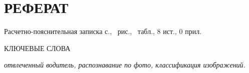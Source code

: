 \section*{РЕФЕРАТ}

Расчетно-пояснительная записка \pageref{LastPage} с., \totalfigures\ рис., \totaltables\ табл., 8 ист., 0 прил.

КЛЮЧЕВЫЕ СЛОВА

\textit{отвлеченный водитель, распознавание по фото, классификация изображений.}


\pagebreak